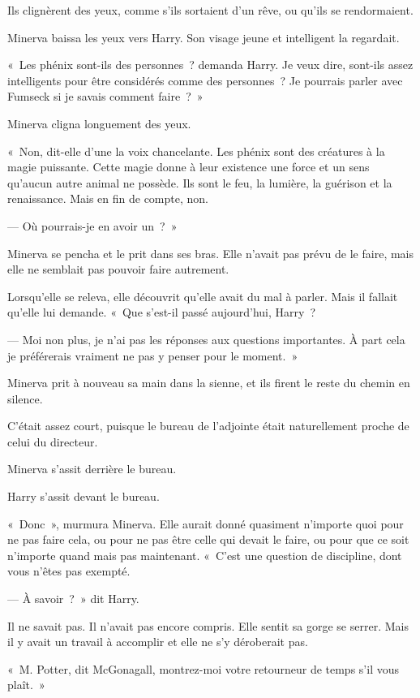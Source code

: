 Ils clignèrent des yeux, comme s'ils sortaient d'un rêve, ou qu'ils se rendormaient.

Minerva baissa les yeux vers Harry.
Son visage jeune et intelligent la regardait.

«~Les phénix sont-ils des personnes~? demanda Harry.
Je veux dire, sont-ils assez intelligents pour être considérés comme des personnes~?
Je pourrais parler avec Fumseck si je savais comment faire~?~»

Minerva cligna longuement des yeux.

«~Non, dit-elle d'une la voix chancelante.
Les phénix sont des créatures à la magie puissante.
Cette magie donne à leur existence une force et un sens qu'aucun autre animal ne possède.
Ils sont le feu, la lumière, la guérison et la renaissance.
Mais en fin de compte, non.

--- Où pourrais-je en avoir un~?~»

Minerva se pencha et le prit dans ses bras.
Elle n'avait pas prévu de le faire, mais elle ne semblait pas pouvoir faire autrement.

Lorsqu'elle se releva, elle découvrit qu'elle avait du mal à parler.
Mais il fallait qu'elle lui demande.
«~Que s'est-il passé aujourd'hui, Harry~?

--- Moi non plus, je n'ai pas les réponses aux questions importantes.
À part cela je préférerais vraiment ne pas y penser pour le moment.~»

Minerva prit à nouveau sa main dans la sienne, et ils firent le reste du chemin en silence.

C'était assez court, puisque le bureau de l'adjointe était naturellement proche de celui du directeur.

Minerva s'assit derrière le bureau.

Harry s'assit devant le bureau.

«~Donc~», murmura Minerva.
Elle aurait donné quasiment n'importe quoi pour ne pas faire cela, ou pour ne pas être celle qui devait le faire, ou pour que ce soit n'importe quand mais pas maintenant.
«~C'est une question de discipline, dont vous n'êtes pas exempté.

--- À savoir~?~»
dit Harry.

Il ne savait pas.
Il n'avait pas encore compris.
Elle sentit sa gorge se serrer.
Mais il y avait un travail à accomplir et elle ne s'y déroberait pas.

«~M. Potter, dit McGonagall, montrez-moi votre retourneur de temps s'il vous plaît.~»

